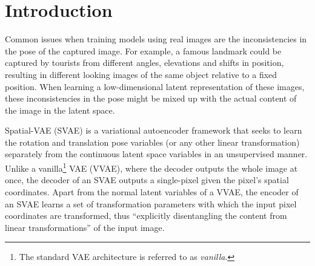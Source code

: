 \section{Introduction} \label{introduction}





Common issues when training models using real images are the inconsistencies in the pose of the captured image. For example, a famous landmark could be captured by tourists from different angles, elevations and shifts in position, resulting in different looking images of the same object relative to a fixed position. When learning a low-dimensional latent representation of these images, these inconsistencies in the pose might be mixed up with the actual content of the image in the latent space.


Spatial-VAE (SVAE) is a variational autoencoder framework that seeks to learn the rotation and translation pose variables (or any other linear transformation) separately from the continuous latent space variables in an unsupervised manner. Unlike a vanilla\footnote{The standard VAE architecture is referred to as \textit{vanilla}.} VAE (VVAE), where the decoder outputs the whole image at once, the decoder of an SVAE outputs a single-pixel given the pixel's spatial coordinates. Apart from the normal latent variables of a VVAE, the encoder of an SVAE learns a set of transformation parameters with which the input pixel coordinates are transformed, thus ``explicitly disentangling the content from linear transformations'' of the input image.

